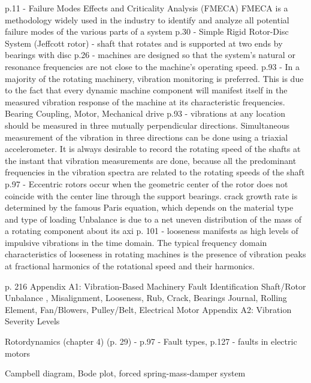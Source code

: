 p.11 - Failure Modes Effects and Criticality Analysis (FMECA) FMECA is a methodology widely used in the industry to identify and analyze all potential failure modes of the various parts of a system
p.30 - Simple Rigid Rotor-Disc System (Jeffcott rotor) - shaft that rotates and is supported at two ends by bearings with disc
p.26 - machines are designed so that the system’s natural or resonance frequencies are not close to the machine’s operating speed.
p.93 - In a majority of the rotating machinery, vibration monitoring is preferred. This is due to the fact that every dynamic machine component will manifest itself in the measured vibration response of the machine at its characteristic frequencies. Bearing Coupling, Motor, Mechanical drive
p.93 - vibrations at any location should be measured in three mutually perpendicular directions. Simultaneous measurement of the vibration in three directions can be done using a triaxial accelerometer. It  is always desirable to record the rotating speed of the  shafts at the instant that vibration measurements are  done, because all the predominant frequencies in the vibration spectra are related to the rotating speeds of the shaft
p.97 - Eccentric rotors occur when the geometric center of the rotor does not coincide with the center line through the support bearings. crack growth rate is determined by the famous Paris equation, which depends on the material type and type of loading
Unbalance is due to a net uneven distribution of the mass of a rotating component about its axi
p. 101 - looseness manifests as high levels of impulsive vibrations in the time domain. The typical frequency domain characteristics of looseness in rotating machines is the presence of vibration peaks at fractional harmonics of the rotational speed and their harmonics.

p. 216 Appendix A1: Vibration-Based Machinery Fault Identification
Shaft/Rotor Unbalance , Misalignment, Looseness, Rub, Crack, Bearings Journal, Rolling Element, Fan/Blowers, Pulley/Belt, Electrical Motor
Appendix A2: Vibration Severity Levels

Rotordynamics (chapter 4) (p. 29)  - p.97 - Fault types, p.127 - faults in electric motors

Campbell diagram, Bode plot, forced spring-mass-damper system

